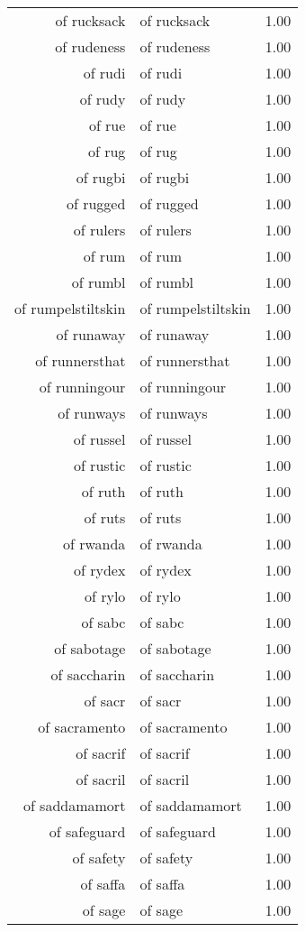 \begin{table}[ht]
\begin{tabular}{rlr}
  of rucksack & of rucksack & 1.00 \\ 
  of rudeness & of rudeness & 1.00 \\ 
  of rudi & of rudi & 1.00 \\ 
  of rudy & of rudy & 1.00 \\ 
  of rue & of rue & 1.00 \\ 
  of rug & of rug & 1.00 \\ 
  of rugbi & of rugbi & 1.00 \\ 
  of rugged & of rugged & 1.00 \\ 
  of rulers & of rulers & 1.00 \\ 
  of rum & of rum & 1.00 \\ 
  of rumbl & of rumbl & 1.00 \\ 
  of rumpelstiltskin & of rumpelstiltskin & 1.00 \\ 
  of runaway & of runaway & 1.00 \\ 
  of runnersthat & of runnersthat & 1.00 \\ 
  of runningour & of runningour & 1.00 \\ 
  of runways & of runways & 1.00 \\ 
  of russel & of russel & 1.00 \\ 
  of rustic & of rustic & 1.00 \\ 
  of ruth & of ruth & 1.00 \\ 
  of ruts & of ruts & 1.00 \\ 
  of rwanda & of rwanda & 1.00 \\ 
  of rydex & of rydex & 1.00 \\ 
  of rylo & of rylo & 1.00 \\ 
  of sabc & of sabc & 1.00 \\ 
  of sabotage & of sabotage & 1.00 \\ 
  of saccharin & of saccharin & 1.00 \\ 
  of sacr & of sacr & 1.00 \\ 
  of sacramento & of sacramento & 1.00 \\ 
  of sacrif & of sacrif & 1.00 \\ 
  of sacril & of sacril & 1.00 \\ 
  of saddamamort & of saddamamort & 1.00 \\ 
  of safeguard & of safeguard & 1.00 \\ 
  of safety & of safety & 1.00 \\ 
  of saffa & of saffa & 1.00 \\ 
  of sage & of sage & 1.00 \\ 

\end{tabular}
\end{table}

